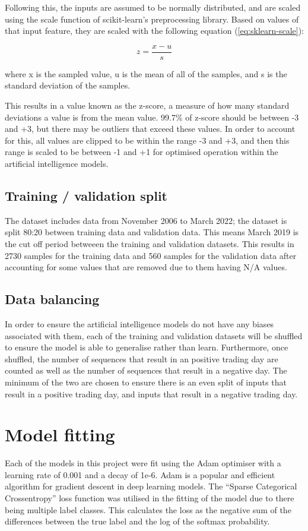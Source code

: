 Following this, the inputs are assumed to be normally distributed, and are scaled using the scale function of
scikit-learn's preprocessing library. Based on values of that input feature, they are scaled with the following
equation (\autoref{eq:sklearn-scale}):

\begin{equation}
    z = \frac{x - u}{s}
    \label{eq:sklearn-scale}
\end{equation}

where x is the sampled value, u is the mean of all of the samples, and s is the standard deviation of the samples.

This results in a value known as the z-score, a measure of how many standard deviations a value is from the mean value.
99.7\% of z-score should be between -3 and +3, but there may be outliers that exceed these values. In order to account for this,
all values are clipped to be within the range -3 and +3, and then this range is scaled to be between -1 and +1 for optimised
operation within the artificial intelligence models.

\subsection{Training / validation split}
The dataset includes data from November 2006 to March 2022; the dataset is split 80:20 between training data and
validation data. This means March 2019 is the cut off period betweeen the training and validation datasets. This
results in 2730 samples for the training data and 560 samples for the validation data after accounting for some
values that are removed due to them having N/A values.

\subsection{Data balancing}
In order to ensure the artificial intelligence models do not have any biases associated with them, each of the training
and validation datasets will be shuffled to ensure the model is able to generalise rather than learn. Furthermore, once
shuffled, the number of sequences that result in an positive trading day are counted as well as the number of sequences that result in
a negative day. The minimum of the two are chosen to ensure there is an even split of inputs that result in a positive trading day,
and inputs that result in a negative trading day.

\section{Model fitting}\label{sec:model_fitting}
Each of the models in this project were fit using the Adam optimiser with a learning rate of 0.001 and a decay of
1e-6. Adam is a popular and efficient algorithm for gradient descent in deep learning models.
The ``Sparse Categorical Crossentropy'' loss function was utilised in the fitting of the model due to there being multiple
label classes. This calculates the loss as the negative sum of the differences between the true label and the log of the softmax
probability.

